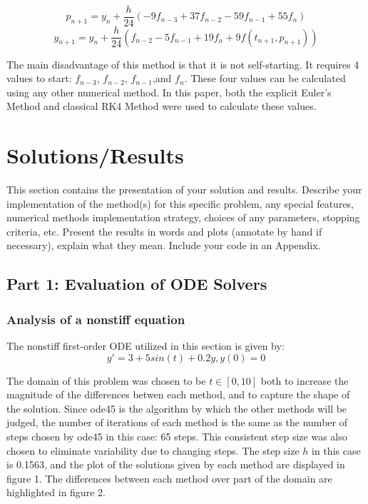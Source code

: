 \documentclass[11pt]{article}
\begin{document}
$$p_{n+1}=y_{n}+\frac{h}{24}(-9f_{n-3}+37f_{n-2}-59f_{n-1}+55f_{n})$$
$$y_{n+1}=y_{n}+\frac{h}{24}(f_{n-2}-5f_{n-1}+19f_{n}+9f(t_{n+1}, p_{n+1}))$$

The main disadvantage of this method is that it is not self-starting. It requires 
4 values to start: $f_{n-3}$, $f_{n-2}$, $f_{n-1}$,and $f_{n}$. These four values 
can be calculated using any other numerical method. In this paper, both the 
explicit Euler's Method and classical RK4 Method were used to calculate these values.

\section{Solutions/Results}\label{S:4}
This section contains the presentation of your solution and results.
Describe your implementation of the method(s) for this specific problem, any 
special features, numerical methods implementation  strategy, choices of any 
parameters, stopping criteria, etc.
Present the results in words and plots (annotate by hand if necessary), explain 
what they mean. Include your code in an Appendix. 

\subsection{Part 1: Evaluation of ODE Solvers}
%

\subsubsection{Analysis of a nonstiff equation}
%

The nonstiff first-order ODE utilized in this section is given by:
$$y'=3+5sin(t)+0.2y, y(0)=0$$

The domain of this problem was chosen to be $t\in [0,10]$ both to increase the 
magnitude of the differences betwen each method, and to capture the shape of
the solution. Since ode45 is the algorithm by which the other methods will be judged, 
the number of iterations of each method is the same as the number of steps chosen
by ode45 in this case: 65 steps. This consistent step size was also chosen to 
eliminate variability due to changing steps. The step size $h$ in this case is
0.1563, and the plot of the solutions given by each method are displayed in figure
1. The differences between each method over part of the domain are highlighted in figure 2.
\end{document}
